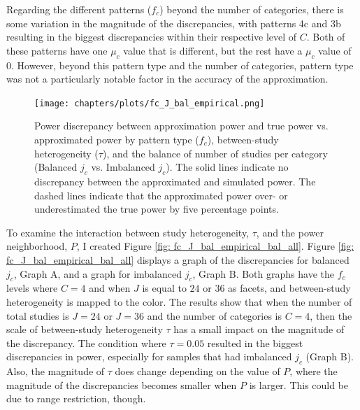 
Regarding the different patterns ($f_c$) beyond the number of categories, there is some variation in the magnitude of the discrepancies, with patterns 4c and 3b resulting in the biggest discrepancies within their respective level of $C$. Both of these patterns have one $\mu_c$ value that is different, but the rest have a $\mu_c$ value of 0. However, beyond this pattern type and the number of categories, pattern type was not a particularly notable factor in the accuracy of the approximation.  

\begin{figure}
    \centering\vspace{-5pt}\texttt{[image: chapters/plots/fc\_J\_bal\_empirical.png]}\caption{Power discrepancy between approximation power and true power vs. approximated power by pattern type ($f_c$), between-study heterogeneity ($\tau$), and the balance of number of studies per category (Balanced $j_c$ vs. Imbalanced $j_c$). The solid lines indicate no discrepancy between the approximated and simulated power. The dashed lines indicate that the approximated power over- or underestimated the true power by five percentage points.\label{fig: fc_J_bal_empirical}}
    \vspace{-5pt}
\end{figure}

To examine the interaction between study heterogeneity, $\tau$, and the power neighborhood, $P$, I created Figure \ref{fig: fc_J_bal_empirical_bal_all}.  Figure \ref{fig: fc_J_bal_empirical_bal_all} displays a graph of the discrepancies for balanced $j_c$, Graph A, and a graph for imbalanced $j_c$, Graph B. Both graphs have the $f_c$ levels where $C = 4$ and when $J$ is equal to $24$ or $36$ as facets, and between-study heterogeneity is mapped to the color. The results show that when the number of total studies is $J = 24$ or $J = 36$ and the number of categories is $C = 4$, then the scale of between-study heterogeneity $\tau$ has a small impact on the magnitude of the discrepancy. The condition where $\tau=0.05$ resulted in the biggest discrepancies in power, especially for samples that had imbalanced $j_c$ (Graph B). Also, the magnitude of $\tau$ does change depending on the value of $P$, where the magnitude of the discrepancies becomes smaller when $P$ is larger. This could be due to range restriction, though. 

